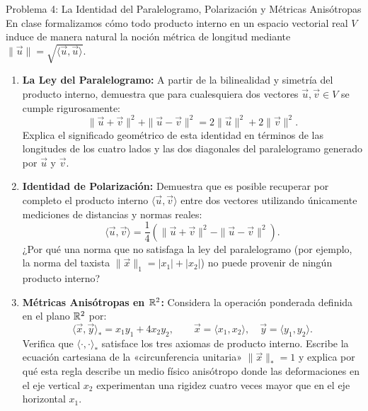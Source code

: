 \documentclass[11pt,letterpaper]{article}
\begin{document}
\begin{infobox}{Problema 4: La Identidad del Paralelogramo, Polarización y Métricas Anisótropas}
En clase formalizamos cómo todo producto interno en un espacio vectorial real $V$ induce de manera natural la noción métrica de longitud mediante $\|\vec{u}\| = \sqrt{\langle \vec{u}, \vec{u} \rangle}$.
\begin{enumerate}[label=(\alph*)]
    \item \textbf{La Ley del Paralelogramo:} A partir de la bilinealidad y simetría del producto interno, demuestra que para cualesquiera dos vectores $\vec{u}, \vec{v} \in V$ se cumple rigurosamente:
    \[
        \|\vec{u} + \vec{v}\|^2 + \|\vec{u} - \vec{v}\|^2 = 2\|\vec{u}\|^2 + 2\|\vec{v}\|^2.
    \]
    Explica el significado geométrico de esta identidad en términos de las longitudes de los cuatro lados y las dos diagonales del paralelogramo generado por $\vec{u}$ y $\vec{v}$.
    \item \textbf{Identidad de Polarización:} Demuestra que es posible recuperar por completo el producto interno $\langle \vec{u}, \vec{v} \rangle$ entre dos vectores utilizando únicamente mediciones de distancias y normas reales:
    \[
        \langle \vec{u}, \vec{v} \rangle = \frac{1}{4}\left(\|\vec{u} + \vec{v}\|^2 - \|\vec{u} - \vec{v}\|^2\right).
    \]
    ¿Por qué una norma que no satisfaga la ley del paralelogramo (por ejemplo, la norma del taxista $\|\vec{x}\|_1 = |x_1| + |x_2|$) no puede provenir de ningún producto interno?
    \item \textbf{Métricas Anisótropas en $\mathbb{R}^2$:} Considera la operación ponderada definida en el plano $\mathbb{R}^2$ por:
    \[
        \langle \vec{x}, \vec{y} \rangle_* = x_1 y_1 + 4 x_2 y_2, \qquad \vec{x} = \langle x_1, x_2 \rangle, \quad \vec{y} = \langle y_1, y_2 \rangle.
    \]
    Verifica que $\langle \cdot, \cdot \rangle_*$ satisface los tres axiomas de producto interno. Escribe la ecuación cartesiana de la «circunferencia unitaria» $\|\vec{x}\|_* = 1$ y explica por qué esta regla describe un medio físico anisótropo donde las deformaciones en el eje vertical $x_2$ experimentan una rigidez cuatro veces mayor que en el eje horizontal $x_1$.
\end{enumerate}
\end{infobox}

\end{document}
